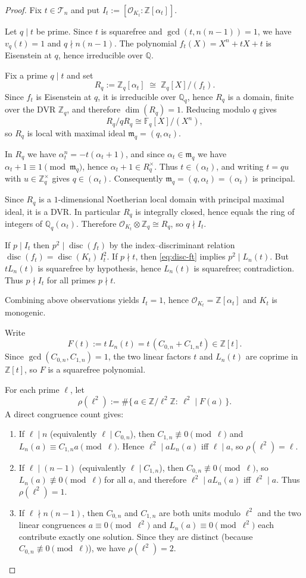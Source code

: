 \documentclass[10pt,a4paper]{amsart}
\newcommand{\F}{\mathbb{F}}
\newcommand{\Ocal}{\mathcal{O}}
\newcommand{\Q}{\mathbb{Q}}
\newcommand{\Z}{\mathbb{Z}}
\newcommand{\disc}{\operatorname{disc}}
\begin{document}
\begin{proof}
Fix $t\in\mathcal T_n$ and put $I_t:=[\Ocal_{K_t}:\Z[\alpha_t]]$.

Let $q\mid t$ be prime. Since $t$ is squarefree and $\gcd(t,n(n-1))=1$, we have $v_q(t)=1$ and $q\nmid n(n-1)$.
The polynomial $f_t(X)=X^n+tX+t$ is Eisenstein at $q$, hence irreducible over $\Q$.


Fix a prime $q\mid t$ and set
\[
R_q:=\Z_q[\alpha_t]\;\cong\;\Z_q[X]/(f_t).
\]
Since $f_t$ is Eisenstein at $q$, it is irreducible over $\Q_q$, hence $R_q$ is a domain, finite over the DVR $\Z_q$,
and therefore $\dim(R_q)=1$. Reducing modulo $q$ gives
\[
R_q/qR_q \cong \F_q[X]/(X^n),
\]
so $R_q$ is local with maximal ideal $\mathfrak m_q=(q,\alpha_t)$.

In $R_q$ we have $\alpha_t^n=-t(\alpha_t+1)$, and since $\alpha_t\in\mathfrak m_q$ we have
$\alpha_t+1\equiv 1\pmod{\mathfrak m_q}$, hence $\alpha_t+1\in R_q^\times$.
Thus $t\in(\alpha_t)$, and writing $t=qu$ with $u\in\Z_q^\times$ gives $q\in(\alpha_t)$.
Consequently $\mathfrak m_q=(q,\alpha_t)=(\alpha_t)$ is principal.

Since $R_q$ is a $1$-dimensional Noetherian local domain with principal maximal ideal, it is a DVR.
In particular $R_q$ is integrally closed, hence equals the ring of integers of $\Q_q(\alpha_t)$.
Therefore $\Ocal_{K_t}\otimes\Z_q \cong R_q$, so $q\nmid I_t$.


If $p\mid I_t$ then $p^2\mid \disc(f_t)$ by the index--discriminant relation
$\disc(f_t)=\disc(K_t)\,I_t^2$.
If $p\nmid t$, then \eqref{eq:disc-ft} implies $p^2\mid L_n(t)$.
But $tL_n(t)$ is squarefree by hypothesis, hence $L_n(t)$ is squarefree; contradiction.
Thus $p\nmid I_t$ for all primes $p\nmid t$.

Combining above observations yields $I_t=1$, hence $\Ocal_{K_t}=\Z[\alpha_t]$ and $K_t$ is monogenic.


Write
\[
F(t):=t\,L_n(t)=t\,(C_{0,n}+C_{1,n}t)\in\Z[t].
\]
Since $\gcd(C_{0,n},C_{1,n})=1$, the two linear factors $t$ and $L_n(t)$ are coprime in $\Z[t]$,
so $F$ is a squarefree polynomial.

For each prime $\ell$, let
\[
\rho(\ell^2):=\#\{\,a\in\Z/\ell^2\Z:\ \ell^2\mid F(a)\,\}.
\]
A direct congruence count gives:
\begin{enumerate}[label=\textup{(\roman*)}]
\item If $\ell\mid n$ (equivalently $\ell\mid C_{0,n}$), then $C_{1,n}\not\equiv 0\pmod\ell$ and
$L_n(a)\equiv C_{1,n}a\pmod\ell$. Hence $\ell^2\mid aL_n(a)$ iff $\ell\mid a$, so $\rho(\ell^2)=\ell$.
\item If $\ell\mid (n-1)$ (equivalently $\ell\mid C_{1,n}$), then $C_{0,n}\not\equiv 0\pmod\ell$, so
$L_n(a)\not\equiv 0\pmod\ell$ for all $a$, and therefore $\ell^2\mid aL_n(a)$ iff $\ell^2\mid a$.
Thus $\rho(\ell^2)=1$.
\item If $\ell\nmid n(n-1)$, then $C_{0,n}$ and $C_{1,n}$ are both units modulo $\ell^2$ and the two linear
congruences $a\equiv 0\pmod{\ell^2}$ and $L_n(a)\equiv 0\pmod{\ell^2}$ each contribute exactly one solution.
Since they are distinct (because $C_{0,n}\not\equiv 0\pmod\ell$), we have $\rho(\ell^2)=2$.
\end{enumerate}


\end{proof}
\end{document}
